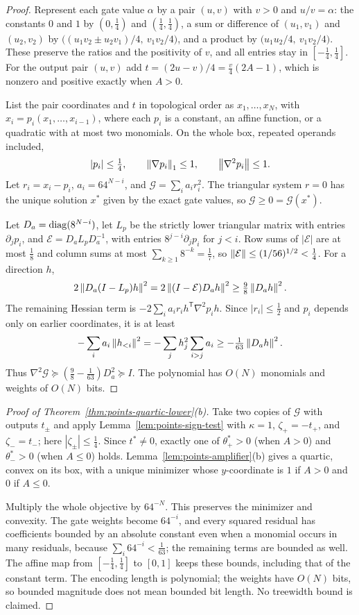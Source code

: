 \begin{proof}
Represent each gate value $\alpha$ by a pair $(u,v)$ with $v>0$ and
$u/v=\alpha$: the constants $0$ and $1$ by $(0,\frac14)$ and
$(\frac14,\frac14)$, a sum or difference of $(u_1,v_1)$ and $(u_2,v_2)$ by
$\bigl((u_1v_2\pm u_2v_1)/4,\ v_1v_2/4\bigr)$, and a product by
$\bigl(u_1u_2/4,\ v_1v_2/4\bigr)$. These preserve the ratios and the
positivity of $v$, and all entries stay in $[-\frac14,\frac14]$. For the
output pair $(u,v)$ add $t=(2u-v)/4=\frac v4(2A-1)$, which is nonzero and
positive exactly when $A>0$.

List the pair coordinates and $t$ in topological order as $x_1,\ldots,x_N$,
with $x_i=p_i(x_1,\ldots,x_{i-1})$, where each $p_i$ is a constant, an affine
function, or a quadratic with at most two monomials. On the whole box,
repeated operands included,
\[
 |p_i|\le\tfrac14,\qquad\left\lVert\nabla p_i\right\rVert_1\le1,\qquad
 \left\lVert\nabla^2p_i\right\rVert\le1 .
\]
Let $r_i=x_i-p_i$, $a_i=64^{N-i}$, and $\mathcal G=\sum_ia_ir_i^2$. The
triangular system $r=0$ has the unique solution $x^*$ given by the exact gate
values, so $\mathcal G\ge0=\mathcal G(x^*)$.

Let $D_a=\operatorname{diag}(8^{N-i})$, let $L_p$ be the strictly lower
triangular matrix with entries $\partial_jp_i$, and
$\mathcal E=D_aL_pD_a^{-1}$, with entries $8^{j-i}\partial_jp_i$ for $j<i$.
Row sums of $|\mathcal E|$ are at most $\frac18$ and column sums at most
$\sum_{k\ge1}8^{-k}=\frac17$, so
$\left\lVert\mathcal E\right\rVert\le(1/56)^{1/2}<\frac14$. For a direction $h$,
\[
 2\left\lVert D_a(I-L_p)h\right\rVert^2=2\left\lVert(I-\mathcal E)D_ah\right\rVert^2\ge\tfrac98\left\lVert D_ah\right\rVert^2 .
\]
The remaining Hessian term is $-2\sum_ia_ir_ih^{\mathsf T}\nabla^2p_ih$.
Since $|r_i|\le\frac12$ and $p_i$ depends only on earlier coordinates, it is
at least
\[
 -\sum_ia_i\left\lVert h_{<i}\right\rVert^2=-\sum_jh_j^2\sum_{i>j}a_i\ge-\tfrac1{63}\left\lVert D_ah\right\rVert^2 .
\]
Thus $\nabla^2\mathcal G\succeq(\frac98-\frac1{63})D_a^2\succeq I$. The
polynomial has $O(N)$ monomials and weights of $O(N)$ bits.
\end{proof}

\begin{proof}[Proof of Theorem~\ref{thm:points-quartic-lower}(b)]
Take two copies of $\mathcal G$ with outputs $t_\pm$ and apply
Lemma~\ref{lem:points-sign-test} with $\kappa=1$, $\zeta_+=-t_+$, and
$\zeta_-=t_-$; here $|\zeta_\pm|\le\frac14$. Since $t^*\ne0$, exactly one of
$\theta_+^*>0$ (when $A>0$) and $\theta_-^*>0$ (when $A\le0$) holds.
Lemma~\ref{lem:points-amplifier}(b) gives a quartic, convex on its box, with
a unique minimizer whose $y$-coordinate is $1$ if $A>0$ and $0$ if $A\le0$.

Multiply the whole objective by $64^{-N}$. This preserves the minimizer and
convexity. The gate weights become $64^{-i}$, and every squared residual has
coefficients bounded by an absolute constant even when a monomial occurs in
many residuals, because $\sum_i64^{-i}<\frac1{63}$; the remaining terms are
bounded as well. The affine map from $[-\frac14,\frac14]$ to $[0,1]$ keeps
these bounds, including that of the constant term. The encoding length is
polynomial; the weights have $O(N)$ bits, so bounded magnitude does not mean
bounded bit length. No treewidth bound is claimed.
\end{proof}


